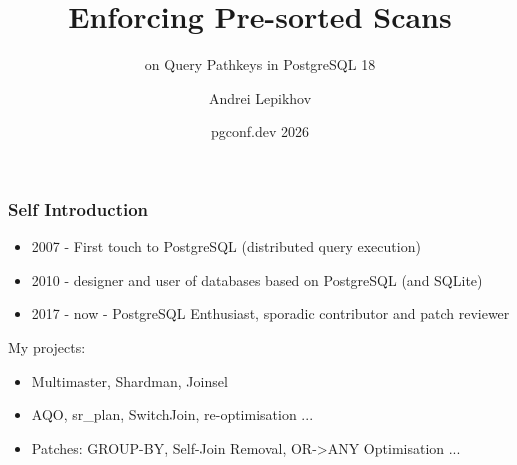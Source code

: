\documentclass{beamer}
\title{Enforcing Pre-sorted Scans}
\subtitle{on Query Pathkeys in PostgreSQL 18}
\author{Andrei Lepikhov}
\institute{pgEdge}
\date{pgconf.dev 2026}
\begin{document}

\begin{frame}
\titlepage
\end{frame}


\begin{frame}[fragile]\frametitle{Self Introduction}
\begin{itemize}
  \item 2007 - First touch to PostgreSQL (distributed query execution)
  \item 2010 - designer and user of databases based on PostgreSQL (and SQLite)
  \item 2017 - now - PostgreSQL Enthusiast, sporadic contributor and patch reviewer
\end{itemize}
My projects:
\begin{itemize}
  \item Multimaster, Shardman, Joinsel
  \item AQO, sr\_plan, SwitchJoin, re-optimisation ...
  \item Patches: GROUP-BY, Self-Join Removal, OR->ANY Optimisation ...
\end{itemize}
\end{frame}

\end{document}
